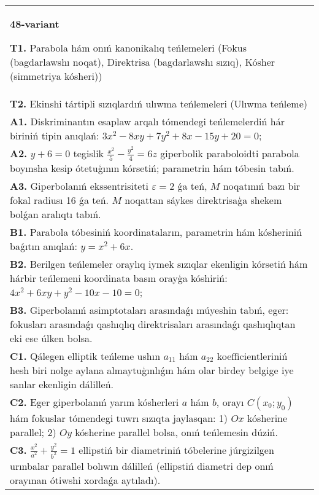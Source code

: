 \documentclass{article}
\begin{document}
\begin{tabular}{m{17cm}}
\textbf{48-variant}
\newline

\textbf{T1.} Parabola hám onıń kanonikalıq teńlemeleri (Fokus (bagdarlawshı noqat), Direktrisa (bagdarlawshı sızıq), Kósher (simmetriya kósheri)) \\
\textbf{T2.} Ekinshi tártipli sızıqlardıń ulıwma teńlemeleri (Ulıwma teńleme) \\
\textbf{A1.} Diskriminantın esaplaw arqalı tómendegi teńlemelerdiń hár biriniń tipin anıqlań: $3 x^2-8 x y+7 y^2+8 x-15 y+20=0$; \\
\textbf{A2.} $y+6=0$ tegislik $\frac{x^2}{5}-\frac{y^2}{4}=6 z$ giperbolik paraboloidti parabola boyınsha kesip ótetuģının kórsetiń; parametrin hám tóbesin tabıń. \\
\textbf{A3.} Giperbolanıń ekssentrisiteti $\varepsilon=2$ ǵa teń, $M$ noqatınıń bazı bir fokal radiusı 16 ǵa teń. $M$ noqattan sáykes direktrisaģa shekem bolǵan aralıqtı tabıń. \\
\textbf{B1.} Parabola tóbesiniń koordinataların, parametrin hám kósheriniń baǵıtın anıqlań: $y=x^2+6 x$. \\
\textbf{B2.} Berilgen teńlemeler oraylıq iymek sızıqlar ekenligin kórsetiń hám hárbir teńlemeni koordinata basın orayģa kóshiriń: $4 x^2+6 x y+y^2-10 x-10=0$; \\
\textbf{B3.} Giperbolanıń asimptotaları arasındaǵı múyeshin tabıń, eger: fokusları arasındaǵı qashıqlıq direktrisaları arasındaǵı qashıqlıqtan eki ese úlken bolsa. \\
\textbf{C1.} Qálegen elliptik teńleme ushın $a_{11}$ hám $a_{22}$ koefficientleriniń hesh biri nolge aylana almaytuģınlıǵın hám olar birdey belgige iye sanlar ekenligin dálilleń. \\
\textbf{C2.} Eger giperbolanıń yarım kósherleri $a$ hám $b$, orayı $C\left(x_0; y_0\right) $ hám fokuslar tómendegi tuwrı sızıqta jaylasqan: 1) $O x$ kósherine parallel; 2) $O y$ kósherine parallel bolsa, onıń teńlemesin dúziń. \\
\textbf{C3.} $\frac{x^2}{a^2}+\frac{y^2}{b^2}=1$ ellipstiń bir diametriniń tóbelerine júrgizilgen urınbalar parallel bolıwın dálilleń (ellipstiń diametri dep onıń orayınan ótiwshi xordaǵa aytıladı). \\

\end{tabular}
\vspace{1cm}
\end{document}
